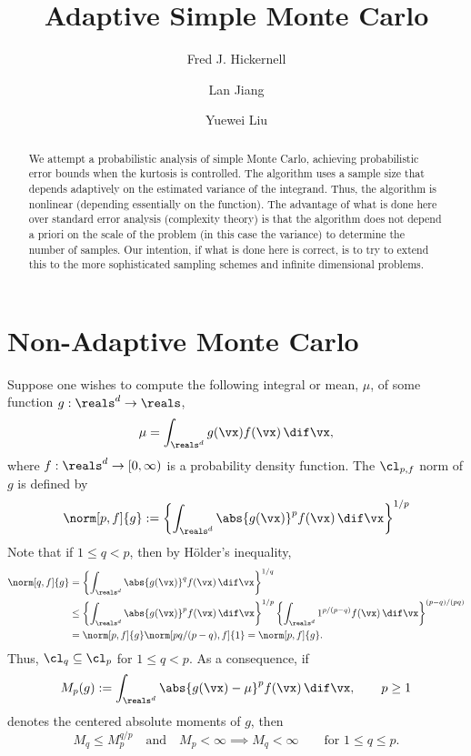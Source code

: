 \documentclass[12pt]{amsart}
\begin{document}
\title{Adaptive Simple Monte Carlo}
\author{Fred J. Hickernell}
\author{Lan Jiang}
\author{Yuewei Liu}
\begin{abstract}We attempt a probabilistic analysis of simple Monte Carlo, achieving probabilistic error bounds when the kurtosis is controlled.  The algorithm uses a sample size that depends adaptively on the estimated variance of the integrand.  Thus, the algorithm is nonlinear (depending essentially on the function).  The advantage of what is done here over standard error analysis (complexity theory) is that the algorithm does not depend a priori on the scale of the problem (in this case the variance) to determine the number of samples.   Our intention, if what is done here is correct, is to try to extend this to the more sophisticated sampling schemes and infinite dimensional problems.
\end{abstract}
\maketitle

\section{Non-Adaptive Monte Carlo}
Suppose one wishes to compute the following integral or mean, $\mu$, of some function $g: \reals^d \to \reals$,
\begin{equation*}
\mu= \int_{\reals^d} g(\vx) f(\vx) \, \dif \vx,
\end{equation*}
where $f: \reals^d \to [0,\infty)$ is a probability density function.  The $\cl_{p,f}$ norm of $g$ is defined by
\[
\norm[p,f]{g} :=\left\{\int_{\reals^d} \abs{g(\vx)}^p f(\vx) \, \dif \vx\right\}^{1/p}
\]
Note that if $1 \le q<p$, then by H\"older's inequality,
\begin{align}\label{LP}
\norm[q,f]{g} &=\left\{\int_{\reals^d} \abs{g(\vx)}^q f(\vx) \, \dif \vx\right\}^{1/q}\\
\nonumber & \le \left\{\int_{\reals^d} \abs{g(\vx)}^p f(\vx) \, \dif \vx \right\}^{1/p} \left\{\int_{\reals^d} 1^{p/(p-q)} f(\vx) \, \dif \vx\right\}^{(p-q)/(pq)} \\
\nonumber & = \norm[p,f]{g} \norm[pq/(p-q),f]{1} = \norm[p,f]{g}.
\end{align}
Thus, $\cl_q \subseteq \cl_p$ for $1 \le q<p$.  As a consequence, if 
\begin{equation} \label{momentdef}
M_p(g) := \int_{\reals^d} \abs{g(\vx)-\mu}^p f(\vx) \, \dif \vx, \qquad p \ge 1
\end{equation}
denotes the centered absolute moments of $g$, then 
\begin{equation}\label{Mineq}
M_q \le M_p^{q/p} \quad \text{and} \quad M_p < \infty \implies M_q <\infty \qquad \text{for }1 \le q \le p.
\end{equation}
\end{document}
